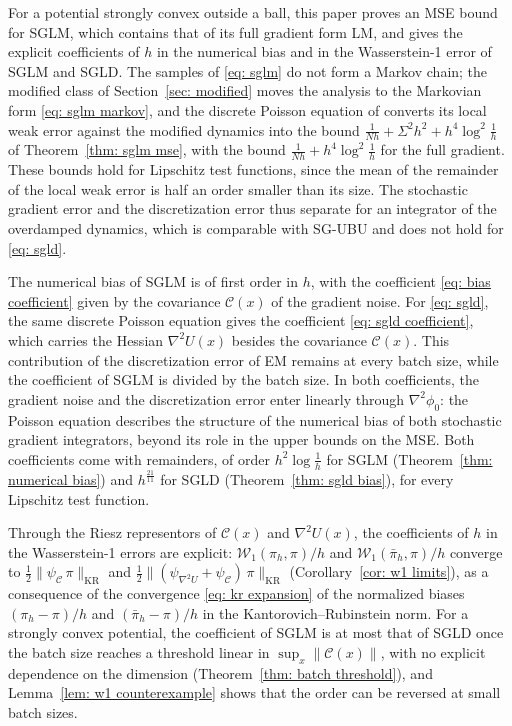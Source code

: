 \documentclass{article}
\newcommand{\norm}[1]{\lVert #1 \rVert}
\numberwithin{equation}{section}
\begin{document}
For a potential strongly convex outside a ball, this paper proves an MSE bound for SGLM, which contains that of its full gradient form LM, and gives the explicit coefficients of $h$ in the numerical bias and in the Wasserstein-1 error of SGLM and SGLD. The samples of \eqref{eq: sglm} do not form a Markov chain; the modified class of Section~\ref{sec: modified} moves the analysis to the Markovian form \eqref{eq: sglm markov}, and the discrete Poisson equation of \citep{lu2025mse, ye2026mse} converts its local weak error against the modified dynamics into the bound $\frac{1}{Nh} + \Sigma^2 h^2 + h^4 \log^2\frac1h$ of Theorem~\ref{thm: sglm mse}, with the bound $\frac{1}{Nh} + h^4 \log^2\frac1h$ for the full gradient. These bounds hold for Lipschitz test functions, since the mean of the remainder of the local weak error is half an order smaller than its size. The stochastic gradient error and the discretization error thus separate for an integrator of the overdamped dynamics, which is comparable with SG-UBU \citep{lu2025mse} and does not hold for \eqref{eq: sgld}.

The numerical bias of SGLM is of first order in $h$, with the coefficient \eqref{eq: bias coefficient} given by the covariance $\mathcal C(x)$ of the gradient noise. For \eqref{eq: sgld}, the same discrete Poisson equation gives the coefficient \eqref{eq: sgld coefficient}, which carries the Hessian $\nabla^2 U(x)$ besides the covariance $\mathcal C(x)$. This contribution of the discretization error of EM remains at every batch size, while the coefficient of SGLM is divided by the batch size. In both coefficients, the gradient noise and the discretization error enter linearly through $\nabla^2 \phi_0$: the Poisson equation describes the structure of the numerical bias of both stochastic gradient integrators, beyond its role in the upper bounds on the MSE. Both coefficients come with remainders, of order $h^2 \log\frac1h$ for SGLM (Theorem~\ref{thm: numerical bias}) and $h^{\frac{21}{11}}$ for SGLD (Theorem~\ref{thm: sgld bias}), for every Lipschitz test function.

Through the Riesz representors of $\mathcal C(x)$ and $\nabla^2 U(x)$, the coefficients of $h$ in the Wasserstein-1 errors are explicit: $\mathcal W_1(\pi_h, \pi)/h$ and $\mathcal W_1(\bar\pi_h, \pi)/h$ converge to $\frac12 \norm{\psi_{\mathcal C}\, \pi}_{\mathrm{KR}}$ and $\frac12 \norm{(\psi_{\nabla^2 U} + \psi_{\mathcal C})\, \pi}_{\mathrm{KR}}$ (Corollary~\ref{cor: w1 limits}), as a consequence of the convergence \eqref{eq: kr expansion} of the normalized biases $(\pi_h - \pi)/h$ and $(\bar\pi_h - \pi)/h$ in the Kantorovich--Rubinstein norm. For a strongly convex potential, the coefficient of SGLM is at most that of SGLD once the batch size reaches a threshold linear in $\sup_x \norm{\mathcal C(x)}$, with no explicit dependence on the dimension (Theorem~\ref{thm: batch threshold}), and Lemma~\ref{lem: w1 counterexample} shows that the order can be reversed at small batch sizes.
\end{document}
